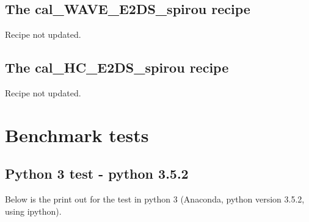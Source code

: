 \subsection{The cal\_WAVE\_E2DS\_spirou recipe}
\label{ch:changelog:At4:cal_WAVE_E2DS_spirou}

Recipe not updated.

\subsection{The cal\_HC\_E2DS\_spirou recipe}
\label{ch:changelog:At4:cal_HC_E2DS_spirou}

Recipe not updated.



\clearpage
\newpage
\section{Benchmark tests}
\label{ch:changelog:At4:benchmark tests}

\subsection{Python 3 test - python 3.5.2}

Below is the print out for the test in python 3 (Anaconda, python version 3.5.2, using ipython).

